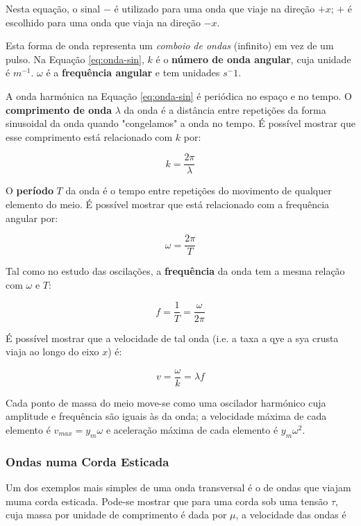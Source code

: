 Nesta equação, o sinal $-$ é utilizado para uma onda que viaje na direção $+x$; $+$ é escolhido para uma onda que viaja na direção $-x$.

Esta forma de onda representa um \emph{comboio de ondas} (infinito) em vez de um pulso. Na Equação \ref{eq:onda-sin}, $k$ é o \textbf{número de onda angular}, cuja unidade é $m^{-1}$. $\omega$ é a \textbf{frequência angular} e tem unidades $s^-1$.

A onda harmónica na Equação \ref{eq:onda-sin} é periódica no espaço e no tempo. O \textbf{comprimento de onda} $\lambda$ da onda é a distância entre repetições da forma sinusoidal da onda quando "congelamos" a onda no tempo. É possível mostrar que esse comprimento está relacionado com $k$ por:

\begin{equation}
    k=\frac{2\pi}{\lambda}
\end{equation}

O \textbf{período} $T$ da onda é o tempo entre repetições do movimento de qualquer elemento do meio. É possível mostrar que está relacionado com a frequência angular por:

\begin{equation}
    \omega=\frac{2\pi}{T}
\end{equation}

Tal como no estudo das oscilações, a \textbf{frequência} da onda tem a mesma relação com $\omega$ e $T$:

\begin{equation*}
    f=\frac{1}{T}=\frac{\omega}{2\pi}
\end{equation*}

É possível mostrar que a velocidade de tal onda (i.e. a taxa a qye a sya crusta viaja ao longo do eixo $x$) é:

\begin{equation}
    v=\frac{\omega}{k}=\lambda f
\end{equation}

Cada ponto de massa do meio move-se como uma oscilador harmónico cuja amplitude e frequência são iguais às da onda; a velocidade máxima de cada elemento é $v_{max}=y_m\omega$ e aceleração máxima de cada elemento é $y_m\omega^2$.

\subsubsection{Ondas numa Corda Esticada}
Um dos exemplos mais simples de uma onda transversal é o de ondas que viajam muma corda esticada. Pode-se mostrar que para uma corda sob uma tensão $\tau$, cuja massa por unidade de comprimento é dada por $\mu$, a velocidade das ondas é

